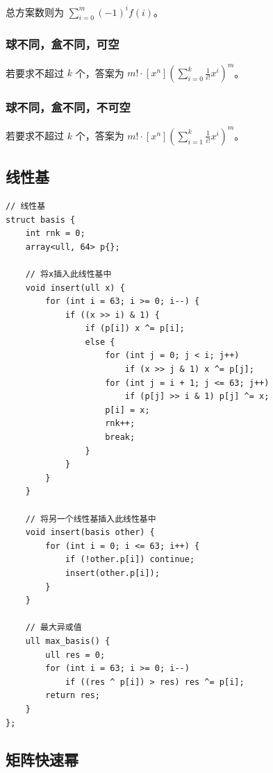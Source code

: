 \documentclass[UTF8]{ctexart}
\begin{document}
\begin{sloppypar}
总方案数则为 $\sum\limits_{i=0}^{m}(-1)^if(i)$。

\subsubsection{球不同，盒不同，可空}

若要求不超过  $k$ 个，答案为 $m!\cdot[x^n]\left(\sum\limits_{i=0}^k\frac{1}{i!}x^i\right)^m$。

\subsubsection{球不同，盒不同，不可空}

若要求不超过  $k$ 个，答案为 $m!\cdot[x^n]\left(\sum\limits_{i=1}^k\frac{1}{i!}x^i\right)^m$。


\subsection{线性基}

\begin{lstlisting}[style=cpp]
// 线性基
struct basis {
    int rnk = 0;
    array<ull, 64> p{};

    // 将x插入此线性基中
    void insert(ull x) {
        for (int i = 63; i >= 0; i--) {
            if ((x >> i) & 1) {
                if (p[i]) x ^= p[i];
                else {
                    for (int j = 0; j < i; j++)
                        if (x >> j & 1) x ^= p[j];
                    for (int j = i + 1; j <= 63; j++)
                        if (p[j] >> i & 1) p[j] ^= x;
                    p[i] = x;
                    rnk++;
                    break;
                }
            }
        }
    }

    // 将另一个线性基插入此线性基中
    void insert(basis other) {
        for (int i = 0; i <= 63; i++) {
            if (!other.p[i]) continue;
            insert(other.p[i]);
        }
    }

    // 最大异或值
    ull max_basis() {
        ull res = 0;
        for (int i = 63; i >= 0; i--)
            if ((res ^ p[i]) > res) res ^= p[i];
        return res;
    }
};
\end{lstlisting}

\subsection{矩阵快速幂}


\end{sloppypar}
\end{document}
